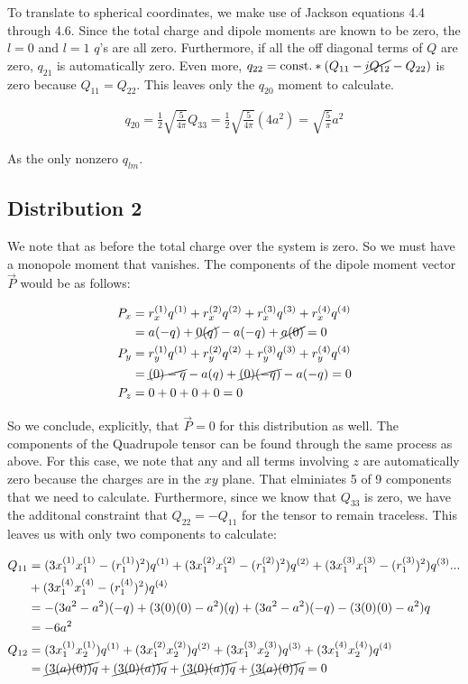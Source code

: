 \documentclass[paper=a4, fontsize=11pt]{scrartcl} %
\numberwithin{equation}{section} %
\numberwithin{figure}{section} %
\numberwithin{table}{section} %
\begin{document}
To translate to spherical coordinates, we make use of Jackson equations 4.4 through 4.6. Since the total charge and dipole moments are known to be zero, the $l=0$ and $l=1$ $q$'s are all zero. Furthermore, if all the off diagonal terms of $Q$ are zero, $q_{21}$ is automatically zero. Even more, $q_{22} = \text{const.} * (Q_{11} - \cancel{iQ_{12}} - Q_{22})$ is zero because $Q_{11} = Q_{22}$. This leaves only the $q_{20}$ moment to calculate. 

\begin{align}
q_{20} = \frac{1}{2}\sqrt{\frac{5}{4\pi}}Q_{33} = \frac{1}{2}\sqrt{\frac{5}{4\pi}}(4a^2) = \sqrt{\frac{5}{\pi}}a^2
\end{align}

As the only nonzero $q_{lm}$.

\subsection{Distribution 2}

We note that as before the total charge over the system is zero. So we must have a monopole moment that vanishes. The components of the dipole moment vector $\vec{P}$ would be as follows: 

\begin{align}
P_x &= r_x^{(1)}q^{(1)} + r_x^{(2)}q^{(2)} + r_x^{(3)}q^{(3)} + r_x^{(4)}q^{(4)} \\
&= a(-q) + \cancel{0(q)} -a(-q) + \cancel{a(0)} = 0  \\
P_y &= r_y^{(1)}q^{(1)} + r_y^{(2)}q^{(2)} + r_y^{(3)}q^{(3)} + r_y^{(4)}q^{(4)} \\
&= \cancel{(0)-q} -a(q) +\cancel{(0)(-q)} -a(-q) = 0 \\
P_z &= 0+0+0+0 = 0
\end{align}

So we conclude, explicitly, that $\vec{P} = 0$ for this distribution as well. The components of the Quadrupole tensor can be found through the same process as above. For this case, we note that any and all terms involving $z$ are automatically zero because the charges are in the $xy$ plane. That elminiates 5 of 9 components that we need to calculate. Furthermore, since we know that $Q_{33}$ is zero, we have the additonal constraint that $Q_{22} = - Q_{11}$ for the tensor to remain traceless. This leaves us with only two components to calculate:

\begin{align}
Q_{11} &= (3x_1^{(1)}x_1^{(1)} - (r_1^{(1)})^2)q^{(1)} + (3x_1^{(2)}x_1^{(2)} - (r_1^{(2)})^2)q^{(2)} + (3x_1^{(3)}x_1^{(3)} - (r_1^{(3)})^2)q^{(3)}  ... \\
&+ (3x_1^{(4)}x_1^{(4)} - (r_1^{(4)})^2)q^{(4)}\\
&= -(3 a^2 - a^2)(-q) + (3(0)(0) - a^2)(q) + (3 a^2 - a^2)(-q) - (3(0)(0) - a^2)q \\
&= -6a^2 \\
Q_{12} &= (3x_1^{(1)}x_2^{(1)})q^{(1)} + (3x_1^{(2)}x_2^{(2)})q^{(2)} + (3x_1^{(3)}x_2^{(3)})q^{(3)}+(3x_1^{(4)}x_2^{(4)})q^{(4)} \\
&= \cancel{(3(a)(0))q} + \cancel{(3(0)(a))q} + \cancel{(3(0)(a))q} + \cancel{(3(a)(0))q} = 0 
\end{align}
\end{document}
